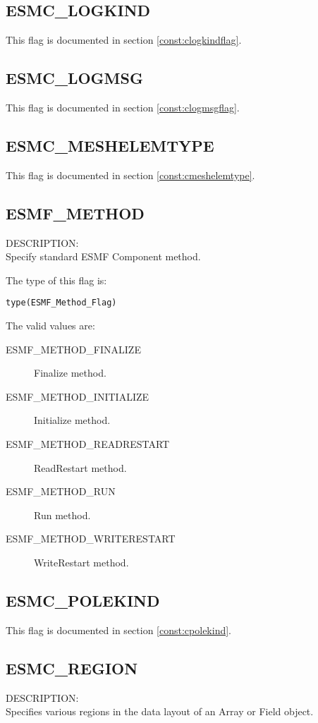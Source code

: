 \subsection{ESMC\_LOGKIND}
This flag is documented in section \ref{const:clogkindflag}.

\subsection{ESMC\_LOGMSG}
This flag is documented in section \ref{const:clogmsgflag}.

\subsection{ESMC\_MESHELEMTYPE}
This flag is documented in section \ref{const:cmeshelemtype}.

\subsection{ESMF\_METHOD}
\label{const:cmethod}

{\sf DESCRIPTION:\\}  
Specify standard ESMF Component method.

The type of this flag is:

{\tt type(ESMF\_Method\_Flag)}

The valid values are:
\begin{description}
\item [ESMF\_METHOD\_FINALIZE]
      Finalize method.
\item [ESMF\_METHOD\_INITIALIZE]
      Initialize method.
\item [ESMF\_METHOD\_READRESTART]
      ReadRestart method.
\item [ESMF\_METHOD\_RUN]
      Run method.
\item [ESMF\_METHOD\_WRITERESTART]
      WriteRestart method.
\end{description}

\subsection{ESMC\_POLEKIND}
This flag is documented in section \ref{const:cpolekind}.

\subsection{ESMC\_REGION}
\label{const:cregion}
{\sf DESCRIPTION:\\}
Specifies various regions in the data layout of an Array or Field object.

